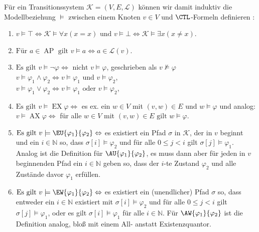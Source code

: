 \begin{definition}
	Für ein Transitionssystem $\mathcal{K}=(V,E,\mathcal{L})$ können wir damit induktiv die Modellbeziehung $\models$ zwischen einem Knoten $v\in V$ und $\CTL$-Formeln definieren \cite{baier2008principles}:
	\begin{enumerate}
		\item $v\models \top \Leftrightarrow \mathcal{K}\models\forall x(x=x)\text{ und }v\models \bot \Leftrightarrow \mathcal{K}\models\exists x(x\neq x)$.
		\item $\text{Für }a\in \operatorname{AP}\text{ gilt }v\models a \Leftrightarrow a\in \mathcal{L}(v)$.
		\item $\text{Es gilt }v\models \neg \varphi \Leftrightarrow \text{ nicht }v\models \varphi$, geschrieben als $v\not\models \varphi$\\
		$v\models \varphi_1 \land \varphi_2 \Leftrightarrow v\models \varphi_1 \text{ und } v\models \varphi_2$,\\
		$v\models \varphi_1 \lor \varphi_2 \Leftrightarrow v\models \varphi_1 \text{ oder } v\models \varphi_2$,
		\item $\text{Es gilt }v\models \operatorname{EX}\varphi \Leftrightarrow$ es ex. ein $w\in V$ mit $(v,w)\in E\text{ und }w\models \varphi$ und analog:\\ 
		$v\models \operatorname{AX}\varphi \Leftrightarrow$ für alle $w\in V$ mit $(v,w)\in E\text{ gilt }w\models \varphi$.
		\item $\text{Es gilt }v\models \EU{\varphi_1}{\varphi_2} \Leftrightarrow$ es existiert ein Pfad $\sigma$ in $\mathcal{K}$, der in $v$ beginnt und ein $i\in \mathbb{N}$ so, dass $\sigma[i]\models \varphi_2$ und für alle $0\leq j < i$ gilt $\sigma[j]\models \varphi_1$. 
		Analog ist die Definition für $\AU{\varphi_1}{\varphi_2}$, es muss dann aber für jeden in $v$ beginnenden Pfad ein $i\in \mathbb{N}$ geben so, dass der $i$-te Zustand $\varphi_2$ und alle Zustände davor $\varphi_1$ erfüllen.
		\item $\text{Es gilt }v\models \EW{\varphi_1}{\varphi_2} \Leftrightarrow$ es existiert ein (unendlicher) Pfad $\sigma$ so, dass entweder ein $i\in \mathbb{N}$ existiert mit $\sigma[i]\models \varphi_2$ und für alle $0\leq j < i$ gilt $\sigma[j]\models \varphi_1$, oder es gilt $\sigma[i]\models \varphi_1$ für alle $i\in \mathbb{N}$.
		Für $\AW{\varphi_1}{\varphi_2}$ ist die Definition analog, bloß mit einem All- anstatt Existenzquantor.
	\end{enumerate}
\end{definition}


